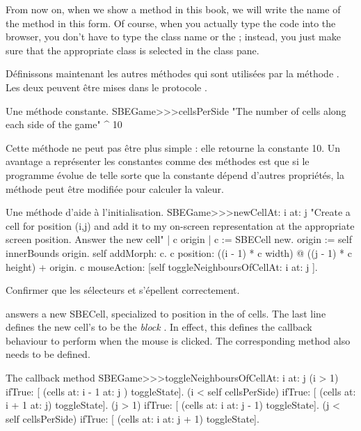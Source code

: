 \documentclass[a4paper,10pt,twoside]{book}
\begin{document}
From now on, when we show a method in this book, we will write the name of the method in this form.  Of course, when you actually type the code into the browser, you don't have to type the class name or the \ct{>>>}; instead, you just make sure that the appropriate class is selected in the class pane.  

Définissons maintenant les autres méthodes qui sont utilisées par la méthode . Les deux peuvent être mises dans le protocole .

\begin{method}[sbegamecellsperside]{Une méthode constante.}
SBEGame>>>cellsPerSide
   "The number of cells along each side of the game"
   ^ 10
\end{method}

Cette méthode ne peut pas être plus simple : elle retourne la constante 10. Un avantage a représenter les constantes comme des méthodes est que si le programme évolue de telle sorte que la constante dépend d'autres propriétés, la méthode peut être modifiée pour calculer la valeur.

\begin{method}[newCellAt:at:]{Une méthode d'aide à l'initialisation.}
SBEGame>>>newCellAt: i at: j
   "Create a cell for position (i,j) and add it to my on-screen
   representation at the appropriate screen position.  Answer the new cell"
   | c origin |
   c := SBECell new.
   origin := self innerBounds origin.
   self addMorph: c.
   c position: ((i - 1) * c width) @ ((j - 1) * c height) + origin.
   c mouseAction: [self toggleNeighboursOfCellAt: i at: j ].
\end{method}

Confirmer que les sélecteurs  et  s'épellent correctement.

 answers a new SBECell, specialized to position  in the  of cells.
The last line defines the new cell's  to be the \emph{block}
\mbox{.}
 In effect, this defines the callback behaviour to perform when the mouse is clicked.
The corresponding method also needs to be defined.

\begin{method}[toggleNeighboursOfCellAt:at:]{The callback method}
SBEGame>>>toggleNeighboursOfCellAt: i at: j
   (i > 1) ifTrue: [ (cells at: i - 1 at: j ) toggleState].
   (i < self cellsPerSide) ifTrue: [ (cells at: i + 1 at: j) toggleState].
   (j > 1) ifTrue: [ (cells at: i  at: j - 1) toggleState].
   (j < self cellsPerSide) ifTrue: [ (cells at: i at: j + 1) toggleState].
\end{method}
\end{document}
